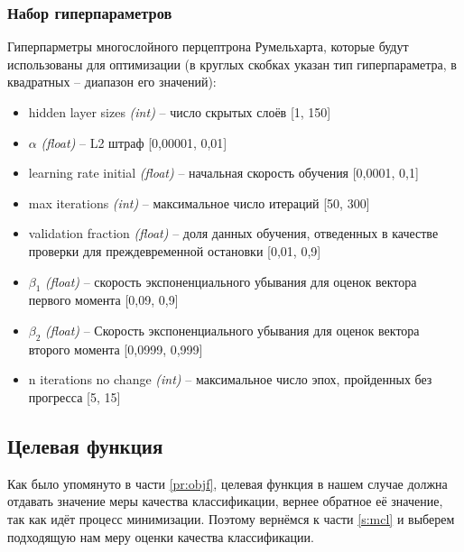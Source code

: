 \documentclass[times,specification,annotation]{itmo-student-thesis}
\begin{document}
		\subsubsection{Набор гиперпараметров}
		Гиперпарметры многослойного перцептрона Румельхарта, которые будут использованы для оптимизации (в круглых скобках указан тип гиперпараметра, в квадратных -- диапазон его значений):
		\begin{itemize}
			\item hidden layer sizes \textit{(int)} -- число скрытых слоёв [1, 150]
			\item $ \alpha $ \textit{(float)} -- L2 штраф [0,00001, 0,01]
			\item learning rate initial \textit{(float)} -- начальная скорость обучения [0,0001, 0,1]
			\item max iterations \textit{(int)} -- максимальное число итераций [50, 300]
			\item validation fraction \textit{(float)} -- доля данных обучения, отведенных в качестве проверки для преждевременной остановки [0,01, 0,9]
			\item $ \beta_{1} $ \textit{(float)} -- скорость экспоненциального убывания для оценок вектора первого момента [0,09, 0,9]
			\item $ \beta_{2} $ \textit{(float)} -- Скорость экспоненциального убывания для оценок вектора второго момента [0,0999, 0,999]
			\item n iterations no change \textit{(int)} -- максимальное число эпох, пройденных без прогресса [5, 15]
		\end{itemize}
		
		\subsection{Целевая функция}
		Как было упомянуто в части \ref{pr:objf}, целевая функция в нашем случае должна отдавать значение меры качества классификации, вернее обратное её значение, так как идёт процесс минимизации. Поэтому вернёмся к части \ref{s:mcl} и выберем подходящую нам меру оценки качества классификации.\par
\end{document}
